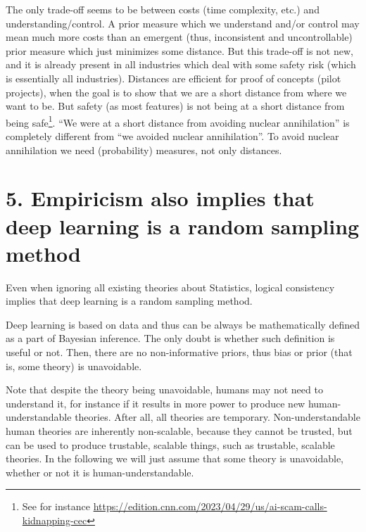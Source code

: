 \documentclass[11pt]{book}
\begin{document}
The only trade-off seems to be between costs (time complexity, etc.) and
understanding/control. A prior measure which we understand and/or
control may mean much more costs than an emergent (thus, inconsistent
and uncontrollable) prior measure which just minimizes some distance.
But this trade-off is not new, and it is already present in all
industries which deal with some safety risk (which is essentially all
industries). Distances are efficient for proof of concepts (pilot
projects), when the goal is to show that we are a short distance from
where we want to be. But safety (as most features) is not being at a
short distance from being safe\footnote{See for instance
  \href{https://edition.cnn.com/2023/04/29/us/ai-scam-calls-kidnapping-cec/index.html}{https://edition.cnn.com/2023/04/29/us/ai-scam-calls-kidnapping-cec}}.
``We were at a short distance from avoiding nuclear annihilation'' is
completely different from ``we avoided nuclear annihilation''. To avoid
nuclear annihilation we need (probability) measures, not only distances.

\hypertarget{empiricism-also-implies-that-deep-learning-is-a-random-sampling-method}{%
\section{5. Empiricism also implies that deep learning is a random
sampling
method}\label{empiricism-also-implies-that-deep-learning-is-a-random-sampling-method}}

Even when ignoring all existing theories about Statistics, logical
consistency implies that deep learning is a random sampling method.

Deep learning is based on data and thus can be always be mathematically
defined as a part of Bayesian inference. The only doubt is whether such
definition is useful or not. Then, there are no non-informative priors,
thus bias or prior (that is, some theory) is unavoidable.

Note that despite the theory being unavoidable, humans may not need to
understand it, for instance if it results in more power to produce new
human-understandable
theories\cite{steinhardt_language_2023}\cite{chen_models_2023}.
After all, all theories are temporary. Non-understandable human theories
are inherently non-scalable, because they cannot be trusted, but can be
used to produce trustable, scalable things, such as trustable, scalable
theories. In the following we will just assume that some theory is
unavoidable, whether or not it is human-understandable.
\end{document}
